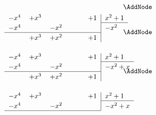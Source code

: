 \begin{NodesList}
\begin{align*}
\begin{minipage}[t]{0.5\textwidth}
\begin{tabular}{lllll|l}
\end{tabular}
\end{minipage}&\AddNode\\
\begin{minipage}[t]{0.5\textwidth}
\begin{tabular}{lllll|l}
$-x^4$& $+x^3$ & \phantom{$-x^2$} & \phantom{$-x$} &$+1$&$ x^2+1$\\ 
\cline{6-6}
  \vrule height 2.5ex width 0pt $-x^4$& &$-x^2$  &  &&$-x^2$\\ 
\cline{1-5}
  \vrule height 2.5ex width 0pt &$+x^3$ & $+x^2$ &  &$+1$&  \\ 
\\
\end{tabular}
\end{minipage}&\AddNode\\
\begin{minipage}[t]{0.5\textwidth}
\begin{tabular}{lllll|l}
$-x^4$& $+x^3$ & \phantom{$-x^2$} & \phantom{$-x$} &$+1$&$ x^2+1$\\ 
\cline{6-6}
  \vrule height 2.5ex width 0pt $-x^4$& &$-x^2$  &  &&$-x^2+x$\\ 
\cline{1-5}
  \vrule height 2.5ex width 0pt &$+x^3$ & $+x^2$ &  &$+1$&  \\ 
\\
\end{tabular}
\end{minipage}&\AddNode\\
\begin{minipage}[t]{0.5\textwidth}
\begin{tabular}{lllll|l}
$-x^4$& $+x^3$ & \phantom{$-x^2$} & \phantom{$-x$} &$+1$&$ x^2+1$\\ 
\cline{6-6}
  \vrule height 2.5ex width 0pt $-x^4$& &$-x^2$  &  &&$-x^2+x$\\ 
\cline{1-5}

\end{tabular}
\end{minipage}
\end{align*}
\end{NodesList}
